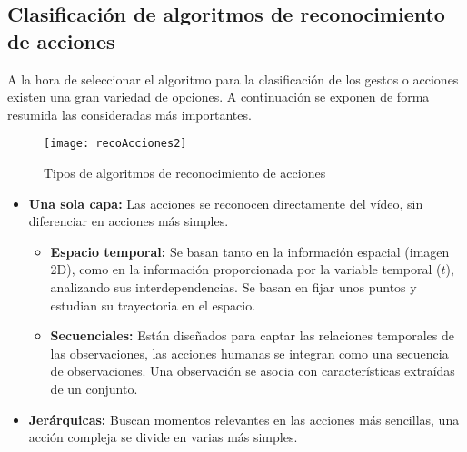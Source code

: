   \subsection{Clasificación de algoritmos de reconocimiento de acciones}
  
  A la hora de  seleccionar el algoritmo para la clasificación de los gestos o acciones existen una gran variedad de opciones. A continuación se exponen de forma resumida las consideradas más importantes.
  \begin{figure}[!ht]
		\centering
		\texttt{[image: recoAcciones2]}
		\caption{Tipos de algoritmos de reconocimiento de acciones~\cite{article}}\label{1}
	\end{figure}
	\FloatBarrier

         \begin{itemize}
         
            \item \textbf {Una sola capa:} Las acciones se reconocen directamente del vídeo, sin diferenciar en acciones más simples.
            
             \begin{itemize}
             
                \item \textbf {Espacio temporal:} Se basan tanto en la información espacial (imagen 2D), como en la información proporcionada por la variable temporal ($t$), analizando sus interdependencias. Se basan en fijar  unos puntos y estudian su trayectoria en el espacio.
                
                \item \textbf {Secuenciales:} Están diseñados para captar las relaciones temporales de las observaciones, las acciones humanas se integran como una secuencia de observaciones. Una observación se asocia con características extraídas de un conjunto.
                
             \end{itemize}
             
             \item \textbf {Jerárquicas:} Buscan momentos relevantes en las acciones más sencillas, una acción compleja se divide en varias más simples.
             
          \end{itemize}
  
